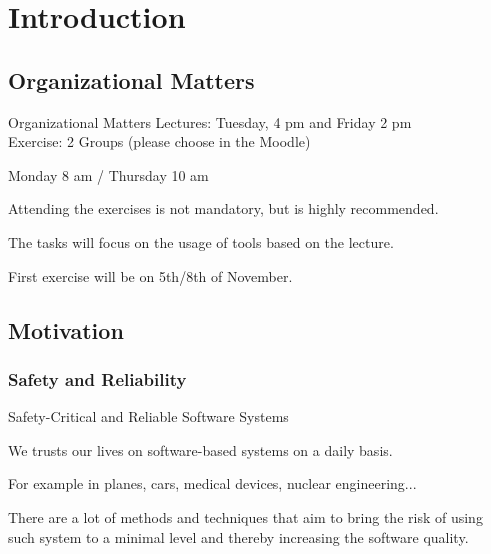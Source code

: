 \chapter{Introduction}


\section{Organizational Matters}

\begin{frame}{Organizational Matters}
	Lectures: Tuesday, 4 pm and Friday 2 pm\\
	\xxx
	Exercise: 2 Groups (please choose in the Moodle)
	\begin{beameritemize}
		\item Monday 8 am / Thursday 10 am
		\item Attending the exercises is not mandatory, but is highly recommended.
		\item The tasks will focus on the usage of tools based on the lecture.
		\item First exercise will be on 5th/8th of November.
	\end{beameritemize}	
\end{frame}



\section{Motivation}

\subsection{Safety and Reliability}

\begin{frame}{Safety-Critical and Reliable Software Systems}
		\begin{beameritemize}
		\item We trusts our lives on software-based systems on a daily basis. 
		\item For example in planes, cars, medical devices, nuclear engineering...
		\item There are a lot of methods and techniques that aim to bring the risk of using such system to a minimal level and thereby increasing the software quality.
	\end{beameritemize}	

\end{frame}



